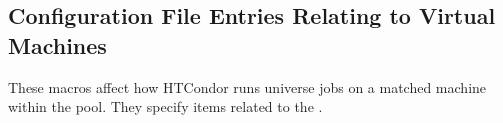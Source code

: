 %
%
%
\subsection{\label{sec:Config-VMs}Configuration File Entries
Relating to Virtual Machines}

These macros affect how HTCondor runs  universe jobs on
a matched machine within the pool.
They specify items related to the .


